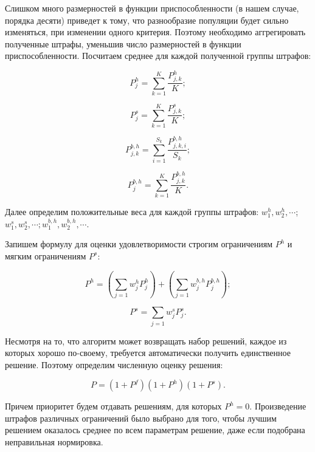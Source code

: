 \documentclass[times,specification,annotation]{itmo-student-thesis}
\begin{document}
Слишком много размерностей в функции приспособленности (в нашем случае, порядка десяти) приведет к тому, что разнообразие популяции будет сильно изменяться, при изменении одного критерия.
Поэтому необходимо аггрегировать полученные штрафы, уменьшив число размерностей в функции приспособленности.
Посчитаем среднее для каждой полученной группы штрафов:

\begin{equation} P^{h}_{j} = \sum\limits_{k = 1}^{K} \frac{P^{h}_{j, k}}{K}; \end{equation}

\begin{equation} P^{s}_{j} = \sum\limits_{k = 1}^{K} \frac{P^{s}_{j, k}}{K}; \end{equation}

\begin{equation} P^{b, h}_{j, k} = \sum\limits_{i = 1}^{S_k} \frac{P^{b, h}_{j, k, i}}{S_k}; \end{equation}

\begin{equation} P^{b, h}_{j} = \sum\limits_{k = 1}^{K} \frac{P^{b, h}_{j, k}}{K}. \end{equation}

Далее определим положительные веса для каждой группы штрафов: $w^h_1, w^h_2, \cdots$; $w^s_1, w^s_2, \cdots; w^{b, h}_1, w^{b, h}_2, \cdots$.

Запишем формулу для оценки удовлетворимости строгим ограничениям $P^h$ и мягким ограничениям $P^s$:

\begin{equation} P^h = \left( \sum\limits_{j = 1} w^h_j P^h_j \right) + \left( \sum\limits_{j = 1} w^{b, h}_j P^{b, h}_j \right); \end{equation}

\begin{equation} P^s = \sum\limits_{j = 1} w^s_j P^s_j. \end{equation}

Несмотря на то, что алгоритм может возвращать набор решений, каждое из которых хорошо по-своему, требуется автоматически получить единственное решение.
Поэтому определим численную оценку решения:

\begin{equation} P = \left( 1 + P^f \right) \left( 1 + P^h \right) \left( 1 + P^s \right). \end{equation}

Причем приоритет будем отдавать решениям, для которых $P^h = 0$.
Произведение штрафов различных ограничений было выбрано для того, чтобы лучшим решением оказалось среднее по всем параметрам решение, даже если подобрана неправильная нормировка.
\end{document}
